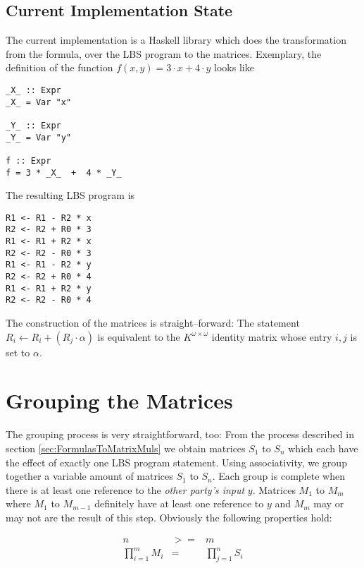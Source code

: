 \documentclass[12pt, a4paper]{article}
\begin{document}
\subsection{Current Implementation State}

The current implementation is a Haskell library which does the transformation
from the formula, over the LBS program to the matrices. Exemplary,
the definition of the function $f(x,y) = 3 \cdot x + 4 \cdot y$ looks like

\lstset{language=Haskell}

\begin{lstlisting}
_X_ :: Expr
_X_ = Var "x"

_Y_ :: Expr
_Y_ = Var "y"

f :: Expr
f = 3 * _X_  +  4 * _Y_
\end{lstlisting}

The resulting LBS program is

\begin{lstlisting}
R1 <- R1 - R2 * x
R2 <- R2 + R0 * 3
R1 <- R1 + R2 * x
R2 <- R2 - R0 * 3
R1 <- R1 - R2 * y
R2 <- R2 + R0 * 4
R1 <- R1 + R2 * y
R2 <- R2 - R0 * 4
\end{lstlisting}

The construction of the matrices is straight--forward: The statement $R_i
\leftarrow R_i + (R_j \cdot \alpha)$ is equivalent to the $K^{\omega \times
\omega}$ identity matrix whose entry $i,j$ is set to $\alpha$.


\section{Grouping the Matrices}

The grouping process is very straightforward, too: From the process described in
section \ref{sec:FormulasToMatrixMuls} we obtain matrices $S_1$ to $S_n$ which
each have the effect of exactly one LBS program statement. Using associativity,
we group together a variable amount of matrices $S_1$ to $S_n$. Each group is
complete when there is at least one reference to the \emph{other party's input}
$y$.  Matrices $M_1$ to $M_m$ where $M_1$ to $M_{m-1}$ definitely have at least
one reference to $y$ and $M_m$ may or may not are the result of this step.
Obviously the following properties hold:

\begin{eqnarray}
n & >= & m \\
\prod_{i=1}^m M_i & = & \prod_{j=1}^n S_i
\end{eqnarray}
\end{document}
